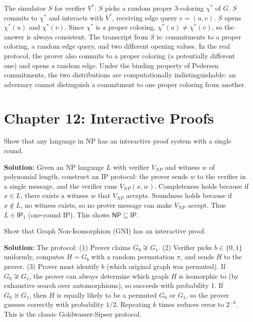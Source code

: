 The simulator $S$ for verifier $V^*$: $S$ picks a random proper 3-coloring $\chi^*$ of $G$. $S$ commits to $\chi^*$ and interacts with $V^*$, receiving edge query $e = (u,v)$. $S$ opens $\chi^*(u)$ and $\chi^*(v)$. Since $\chi^*$ is a proper coloring, $\chi^*(u) \neq \chi^*(v)$, so the answer is always consistent. The transcript from $S$ is: commitments to a proper coloring, a random edge query, and two different opening values. In the real protocol, the prover also commits to a proper coloring (a potentially different one) and opens a random edge. Under the binding property of Pedersen commitments, the two distributions are computationally indistinguishable: an adversary cannot distinguish a commitment to one proper coloring from another.

\section{Chapter 12: Interactive Proofs}

\begin{exercise}[Basic]
Show that any language in NP has an interactive proof system with a single round.
\end{exercise}
\textbf{Solution:} Given an NP language $L$ with verifier $V_{NP}$ and witness $w$ of polynomial length, construct an IP protocol: the prover sends $w$ to the verifier in a single message, and the verifier runs $V_{NP}(x, w)$. Completeness holds because if $x \in L$, there exists a witness $w$ that $V_{NP}$ accepts. Soundness holds because if $x \notin L$, no witness exists, so no prover message can make $V_{NP}$ accept. Thus $L \in \mathsf{IP}_1$ (one-round IP). This shows $\mathsf{NP} \subseteq \mathsf{IP}$.

\begin{exercise}[Intermediate]
Show that Graph Non-Isomorphism (GNI) has an interactive proof.
\end{exercise}
\textbf{Solution:} The protocol: (1) Prover claims $G_0 \not\cong G_1$. (2) Verifier picks $b \in \{0, 1\}$ uniformly, computes $H = G_b$ with a random permutation $\pi$, and sends $H$ to the prover. (3) Prover must identify $b$ (which original graph was permuted). If $G_0 \not\cong G_1$, the prover can always determine which graph $H$ is isomorphic to (by exhaustive search over automorphisms), so succeeds with probability 1. If $G_0 \cong G_1$, then $H$ is equally likely to be a permuted $G_0$ or $G_1$, so the prover guesses correctly with probability $1/2$. Repeating $k$ times reduces error to $2^{-k}$. This is the classic Goldwasser-Sipser protocol.

